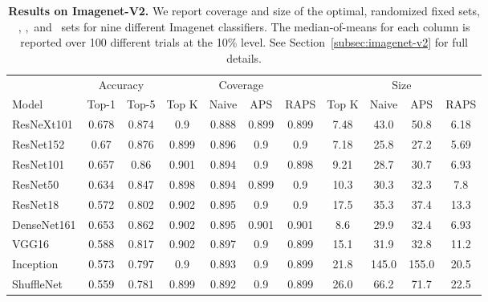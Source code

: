 \begin{table}[t] 
\centering 
\small 
\begin{tabular}{lcccccccccc} 
\toprule 
 & \multicolumn{2}{c}{Accuracy}  & \multicolumn{4}{c}{Coverage} & \multicolumn{4}{c}{Size} \\ 
\cmidrule(r){2-3}  \cmidrule(r){4-7}  \cmidrule(r){8-11} 
Model & Top-1 & Top-5 & Top K & Naive & APS & RAPS & Top K & Naive & APS & RAPS \\ 
\midrule 
 ResNeXt101 &  0.678 &  0.874 & 0.9 & 0.888 & 0.899 & 0.899 & 7.48 & 43.0 & 50.8 & 6.18 \\ 
 ResNet152 &  0.67 &  0.876 & 0.899 & 0.896 & 0.9 & 0.9 & 7.18 & 25.8 & 27.2 & 5.69 \\ 
 ResNet101 &  0.657 &  0.86 & 0.901 & 0.894 & 0.9 & 0.898 & 9.21 & 28.7 & 30.7 & 6.93 \\ 
 ResNet50 &  0.634 &  0.847 & 0.898 & 0.894 & 0.899 & 0.9 & 10.3 & 30.3 & 32.3 & 7.8 \\ 
 ResNet18 &  0.572 &  0.802 & 0.902 & 0.895 & 0.9 & 0.9 & 17.5 & 35.3 & 37.4 & 13.3 \\ 
 DenseNet161 &  0.653 &  0.862 & 0.902 & 0.895 & 0.901 & 0.901 & 8.6 & 29.9 & 32.4 & 6.93 \\ 
 VGG16 &  0.588 &  0.817 & 0.902 & 0.897 & 0.9 & 0.899 & 15.1 & 31.9 & 32.8 & 11.2 \\ 
 Inception &  0.573 &  0.797 & 0.9 & 0.893 & 0.9 & 0.899 & 21.8 & 145.0 & 155.0 & 20.5 \\ 
 ShuffleNet &  0.559 &  0.781 & 0.899 & 0.892 & 0.9 & 0.899 & 26.0 & 66.2 & 71.7 & 22.5 \\ 
\bottomrule 
\end{tabular} 
\caption{\textbf{Results on Imagenet-V2.} We report coverage and size of the optimal, randomized fixed sets, \naive, \aps,\ and \raps\ sets for nine different Imagenet classifiers. The median-of-means for each column is reported over 100 different trials at the 10\% level. See Section~\ref{subsec:imagenet-v2} for full details.} 
\label{table:imagenet-v2} 
\end{table} 
